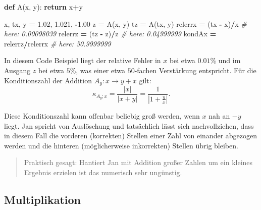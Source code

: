 \documentclass[
]{book}
\newenvironment{Shaded}{\begin{snugshade}}{\end{snugshade}}
\newcommand{\CommentTok}[1]{\textcolor[rgb]{0.56,0.35,0.01}{\textit{#1}}}
\newcommand{\ControlFlowTok}[1]{\textcolor[rgb]{0.13,0.29,0.53}{\textbf{#1}}}
\newcommand{\FloatTok}[1]{\textcolor[rgb]{0.00,0.00,0.81}{#1}}
\newcommand{\KeywordTok}[1]{\textcolor[rgb]{0.13,0.29,0.53}{\textbf{#1}}}
\newcommand{\NormalTok}[1]{#1}
\newcommand{\OperatorTok}[1]{\textcolor[rgb]{0.81,0.36,0.00}{\textbf{#1}}}
\newenvironment {JHSAYS} [0] {\begin{quote}\color{jhsc}} {\end{quote}}
\theoremstyle{definition}
\theoremstyle{definition}
\theoremstyle{definition}
\theoremstyle{definition}
\theoremstyle{remark}
\begin{document}
\begin{Shaded}
\begin{Highlighting}[]
\KeywordTok{def}\NormalTok{ A(x, y):}
    \ControlFlowTok{return}\NormalTok{ x}\OperatorTok{+}\NormalTok{y}

\NormalTok{x, tx, y }\OperatorTok{=} \FloatTok{1.02}\NormalTok{, }\FloatTok{1.021}\NormalTok{, }\OperatorTok{{-}}\FloatTok{1.00}
\NormalTok{z }\OperatorTok{=}\NormalTok{ A(x, y)}
\NormalTok{tz }\OperatorTok{=}\NormalTok{ A(tx, y)}
\NormalTok{relerrx }\OperatorTok{=}\NormalTok{ (tx }\OperatorTok{{-}}\NormalTok{ x)}\OperatorTok{/}\NormalTok{x        }\CommentTok{\# here: 0.00098039}
\NormalTok{relerrz }\OperatorTok{=}\NormalTok{ (tz }\OperatorTok{{-}}\NormalTok{ z)}\OperatorTok{/}\NormalTok{z        }\CommentTok{\# here: 0.04999999}
\NormalTok{kondAx }\OperatorTok{=}\NormalTok{ relerrz}\OperatorTok{/}\NormalTok{relerrx    }\CommentTok{\# here: 50.9999999}
\end{Highlighting}
\end{Shaded}

In diesem Code Beispiel liegt der relative Fehler in \(x\) bei etwa \(0.01\)\% und im Ausgang \(z\) bei etwa \(5\)\%, was einer etwa \(50\)-fachen Verstärkung entspricht.
Für die Konditionszahl der Addition \(A_y\colon x \to y+x\) gilt:
\begin{equation*}
\kappa_{A_y;x} = \frac{|x|}{|x+y|} = \frac{1}{|1+\frac{y}{x}|}.
\end{equation*}

Diese Konditionszahl kann offenbar beliebig groß werden, wenn \(x\) nah an \(-y\) liegt. Jan spricht von Auslöschung und tatsächlich lässt sich nachvollziehen, dass in diesem Fall die vorderen (korrekten) Stellen einer Zahl von einander abgezogen werden und die hinteren (möglicherweise inkorrekten) Stellen übrig bleiben.

\leavevmode\hypertarget{rem-accu-iter}{}%
\begin{JHSAYS}
Praktisch gesagt: Hantiert Jan mit Addition großer Zahlen um ein kleines Ergebnis erzielen ist das numerisch sehr ungünstig.

\end{JHSAYS}

\hypertarget{multiplikation}{%
\subsection{Multiplikation}\label{multiplikation}}
\end{document}

